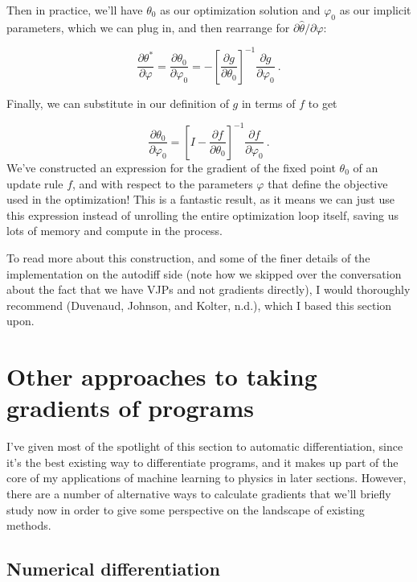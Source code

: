 \documentclass[
  11pt,
  numbers=noendperiod]{book}
\begin{document}
Then in practice, we'll have \(\theta_0\) as our optimization solution
and \(\varphi_0\) as our implicit parameters, which we can plug in, and
then rearrange for \(\partial\hat{\theta}/\partial\varphi\):

\[
    \frac{\partial\theta^*}{\partial\varphi} = \frac{\partial\theta_0}{\partial\varphi_0}= -\left[\frac{\partial g}{\partial \theta_0}\right]^{-1}  \frac{\partial g}{\partial \varphi_0} ~.
\]

Finally, we can substitute in our definition of \(g\) in terms of \(f\)
to get

\[
\frac{\partial\theta_0}{\partial\varphi_0}= \left[I - \frac{\partial f}{\partial \theta_0} \right]^{-1} \frac{\partial f}{\partial \varphi_0}~.
\] We've constructed an expression for the gradient of the fixed point
\(\theta_0\) of an update rule \(f\), and with respect to the parameters
\(\varphi\) that define the objective used in the optimization! This is
a fantastic result, as it means we can just use this expression instead
of unrolling the entire optimization loop itself, saving us lots of
memory and compute in the process.

To read more about this construction, and some of the finer details of
the implementation on the autodiff side (note how we skipped over the
conversation about the fact that we have VJPs and not gradients
directly), I would thoroughly recommend (Duvenaud, Johnson, and Kolter,
n.d.), which I based this section upon.

\hypertarget{other-approaches-to-taking-gradients-of-programs}{%
\section{Other approaches to taking gradients of
programs}\label{other-approaches-to-taking-gradients-of-programs}}

I've given most of the spotlight of this section to automatic
differentiation, since it's the best existing way to differentiate
programs, and it makes up part of the core of my applications of machine
learning to physics in later sections. However, there are a number of
alternative ways to calculate gradients that we'll briefly study now in
order to give some perspective on the landscape of existing methods.

\hypertarget{numerical-differentiation}{%
\subsection{Numerical differentiation}\label{numerical-differentiation}}
\end{document}
